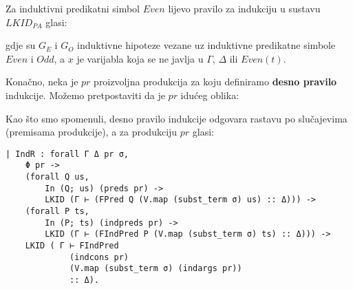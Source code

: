 \begin{example}
  Za induktivni predikatni simbol \(\mathit{Even}\)
  lijevo pravilo za indukciju u sustavu \(\mathit{LKID}_{\mathit{PA}}\) glasi:
  \begin{small}
    \begin{prooftree}
    \end{prooftree}
  \end{small}
  \noindent gdje su \(G_{E}\) i \(G_{O}\) induktivne hipoteze vezane uz
  induktivne predikatne simbole \(\mathit{Even}\) i \(\mathit{Odd}\),
  a \(x\) je varijabla koja se ne javlja u \(\Gamma\), \(\Delta\) ili \(\mathit{Even}(t)\).
\end{example}

Konačno, neka je \(pr\) proizvoljna produkcija za koju definiramo \textbf{desno pravilo} indukcije.
Možemo pretpostaviti da je \(pr\) idućeg oblika:
\begin{prooftree}
\end{prooftree}
\noindent Kao što smo spomenuli, desno pravilo indukcije odgovara rastavu po slučajevima (premisama produkcije),
a za produkciju \(pr\) glasi:
\begin{prooftree}
\end{prooftree}
\begin{verbatim}
| IndR : forall Γ Δ pr σ,
    Φ pr ->
    (forall Q us,
        In (Q; us) (preds pr) ->
        LKID (Γ ⊢ (FPred Q (V.map (subst_term σ) us) :: Δ))) ->
    (forall P ts,
        In (P; ts) (indpreds pr) ->
        LKID (Γ ⊢ (FIndPred P (V.map (subst_term σ) ts) :: Δ))) ->
    LKID ( Γ ⊢ FIndPred
             (indcons pr)
             (V.map (subst_term σ) (indargs pr))
             :: Δ).
\end{verbatim}

